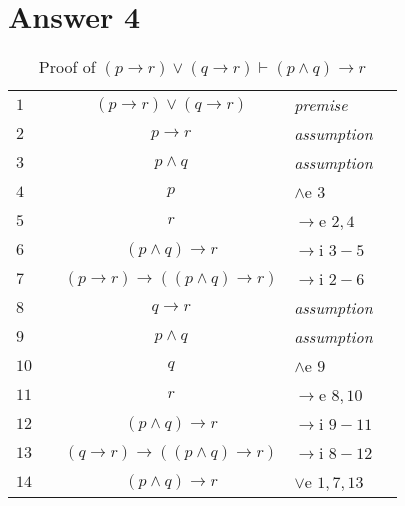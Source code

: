 \documentclass[12pt]{article}
\begin{document}
\section*{Answer 4}
\begin{table}[H]
	\centering
	\caption{Proof of $ (p \rightarrow r) \lor (q \rightarrow r) \vdash (p \land q) \rightarrow r  $}
	\begin{tabular}{llcll}
	\hline 
	\hline
		$1$ & & $ (p \rightarrow r) \lor (q \rightarrow r)$ & \textit{premise} & \\ \cline{2-5}
		
		$2$ &\multicolumn{1}{|c}{} & $p \rightarrow r$ &\textit{assumption} &\multicolumn{1}{c|}{}\\ \cline{3-4}
		 
		$3$ &\multicolumn{1}{|c}{}&\multicolumn{1}{|c}{$p \land q$} &\multicolumn{1}{l|}{\textit{assumption}}&\multicolumn{1}{c|}{}\\ 
		
		$4$ &\multicolumn{1}{|c}{}&\multicolumn{1}{|c}{ $p$} &\multicolumn{1}{l|}{$\land$e $3 $}&\multicolumn{1}{c|}{}\\
		
		$5$ &\multicolumn{1}{|c}{}&\multicolumn{1}{|c}{ $r$} & \multicolumn{1}{l|}{$\rightarrow$e $2,4$} &\multicolumn{1}{c|}{}\\ \cline{3-4}
		
		$6$ &\multicolumn{1}{|c}{}& $(p \land q ) \rightarrow r$ & $\rightarrow$i $3-5$ & \multicolumn{1}{c|}{}\\ \cline{2-5}
		
		$7$ & & $(p \rightarrow r) \rightarrow ((p \land q) \rightarrow r)$ & $\rightarrow$i $2-6$ & \\ \cline{2-5}
		
	    $8$ &\multicolumn{1}{|c}{} & $q \rightarrow r$ &\textit{assumption} &\multicolumn{1}{c|}{}\\ \cline{3-4}
		 
		$9$ &\multicolumn{1}{|c}{}&\multicolumn{1}{|c}{$p \land q$} &\multicolumn{1}{l|}{\textit{assumption}}&\multicolumn{1}{c|}{}\\ 
		
		$10$ &\multicolumn{1}{|c}{}&\multicolumn{1}{|c}{ $q$} &\multicolumn{1}{l|}{$\land$e $9$}&\multicolumn{1}{c|}{}\\
		
		$11$ &\multicolumn{1}{|c}{}&\multicolumn{1}{|c}{ $r$} & \multicolumn{1}{l|}{$\rightarrow$e $8,10$} &\multicolumn{1}{c|}{}\\ \cline{3-4}
		
		$12$ &\multicolumn{1}{|c}{}& $(p \land q ) \rightarrow r$ & $\rightarrow$i $9-11$ & \multicolumn{1}{c|}{}\\ \cline{2-5}
		
		$13$ & & $(q \rightarrow r) \rightarrow ((p \land q) \rightarrow r)$ & $\rightarrow$i $8-12$ & \\
		
		$14$ & & $(p \land q) \rightarrow r$ & $\lor$e $1, 7, 13 $ & \\
	
	\end{tabular}
\end{table}
\end{document}
